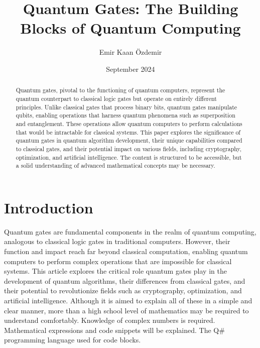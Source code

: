 \documentclass{article}
\title{Quantum Gates: The Building Blocks of Quantum Computing}
\author{Emir Kaan Özdemir}
\date{September 2024}
\begin{document}
\maketitle

\begin{abstract}
    Quantum gates, pivotal to the functioning of quantum computers, represent the quantum counterpart to classical logic gates but operate on entirely different principles. Unlike classical gates that process binary bits, quantum gates manipulate qubits, enabling operations that harness quantum phenomena such as superposition and entanglement. These operations allow quantum computers to perform calculations that would be intractable for classical systems. This paper explores the significance of quantum gates in quantum algorithm development, their unique capabilities compared to classical gates, and their potential impact on various fields, including cryptography, optimization, and artificial intelligence. The content is structured to be accessible, but a solid understanding of advanced mathematical concepts may be necessary. 
\end{abstract}

\vspace{7cm}

\tableofcontents

\vspace{13cm}

\section{Introduction}
Quantum gates are fundamental components in the realm of quantum computing, analogous to classical logic gates in traditional computers. However, their function and impact reach far beyond classical computation, enabling quantum computers to perform complex operations that are impossible for classical systems. This article explores the critical role quantum gates play in the development of quantum algorithms, their differences from classical gates, and their potential to revolutionize fields such as cryptography, optimization, and artificial intelligence. Although it is aimed to explain all of these in a simple and clear manner, more than a high school level of mathematics may be required to understand comfortably. Knowledge of complex numbers is required. Mathematical expressions and code snippets will be explained. The Q\# programming language used for code blocks.

\vspace{3cm}
\end{document}
